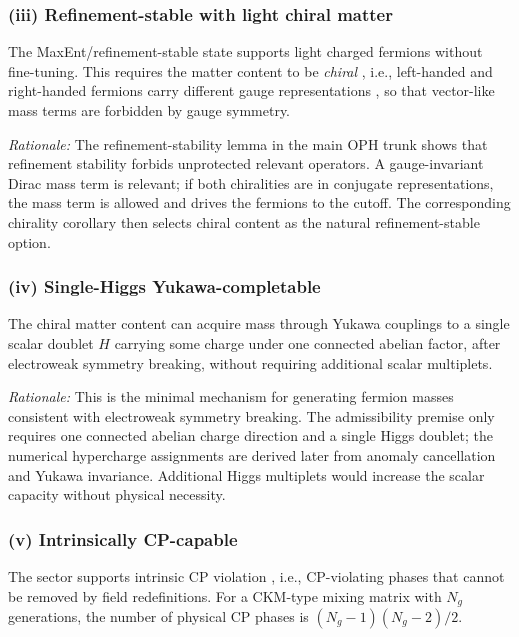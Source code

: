 \subsubsection{(iii) Refinement-stable with light chiral matter}\label{iii-refinement-stable-with-light-chiral-matter}

The MaxEnt/refinement-stable state supports light charged fermions without fine-tuning. This requires the matter content to be \emph{chiral} , i.e., left-handed and right-handed fermions carry different gauge representations , so that vector-like mass terms are forbidden by gauge symmetry.

\emph{Rationale:} The refinement-stability lemma in the main OPH trunk shows that refinement stability forbids unprotected relevant operators. A gauge-invariant Dirac mass term is relevant; if both chiralities are in conjugate representations, the mass term is allowed and drives the fermions to the cutoff. The corresponding chirality corollary then selects chiral content as the natural refinement-stable option.

\subsubsection{(iv) Single-Higgs Yukawa-completable}\label{iv-single-higgs-yukawa-completable}

The chiral matter content can acquire mass through Yukawa couplings to a single scalar doublet \(H\) carrying some charge under one connected abelian factor, after electroweak symmetry breaking, without requiring additional scalar multiplets.

\emph{Rationale:} This is the minimal mechanism for generating fermion masses consistent with electroweak symmetry breaking. The admissibility premise only requires one connected abelian charge direction and a single Higgs doublet; the numerical hypercharge assignments are derived later from anomaly cancellation and Yukawa invariance. Additional Higgs multiplets would increase the scalar capacity without physical necessity.

\subsubsection{(v) Intrinsically CP-capable}\label{v-intrinsically-cp-capable}

The sector supports intrinsic CP violation , i.e., CP-violating phases that cannot be removed by field redefinitions. For a CKM-type mixing matrix with \(N_g\) generations, the number of physical CP phases is \((N_g - 1)(N_g - 2)/2\).

